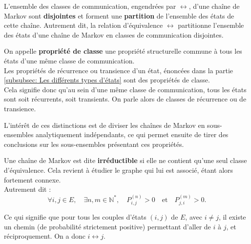 \documentclass{article}
\begin{document}
L'ensemble des classes de communication, engendrées par $\leftrightarrow$, d'une chaîne de Markov sont \textbf{disjointes} et forment une \textbf{partition} de l'ensemble des états de cette chaîne.
Autrement dit, la relation d'équivalence $\leftrightarrow$ partitionne l'ensemble des états d'une chaîne de Markov en classes de communication disjointes. \\

\begin{tcolorbox}[colback=white,colframe=blue!80!black,title=Propriétés de classe]
On appelle \textbf{propriété de classe} une propriété structurelle commune à tous les états d'une même classe de communication. \\

Les propriétés de récurrence ou transience d'un état, énoncées dans la partie \ref{subsubsec: Les différents types d'états} sont des propriétés de classe. \\

Cela signifie donc qu'au sein d'une même classe de communication, tous les états sont soit récurrents, soit transients. On parle alors de classes de récurrence ou de transience.
\end{tcolorbox}

L'intérêt de ces distinctions est de diviser les chaînes de Markov en sous-ensembles analytiquement indépendants, ce qui permet ensuite de tirer des conclusions sur les sous-ensembles présentant ces propriétés. \\

\begin{tcolorbox}[colback=white,colframe=blue!80!black,title=Chaîne de Markov irréductible]
Une chaîne de Markov est dite \textbf{irréductible} si elle ne contient qu'une seul classe d'équivalence. Cela revient à étudier le graphe qui lui est associé, étant alors fortement connexe. \\

Autrement dit :
\[
\forall i, j \in E, \quad \exists n, m \in \mathbb{N}^{*}, \quad P_{i,j}^{(n)} > 0 \quad \text{et} \quad P_{j,i}^{(m)} > 0.
\]

Ce qui signifie que pour tous les couples d'états $(i, j)$ de $E$, avec $i \neq j$, il existe un chemin (de probabilité strictement positive) permettant d'aller de $i$ à $j$, et réciproquement. On a donc $i \leftrightarrow j$.
\end{tcolorbox}
\end{document}
